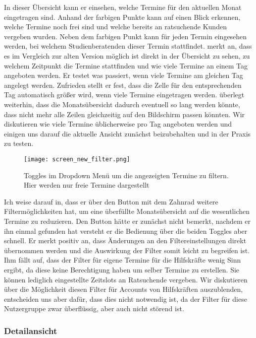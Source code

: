 In dieser Übersicht kann er einsehen, welche Termine für den aktuellen Monat
eingetragen sind. Anhand der farbigen Punkte  kann \ipName auf einen Blick erkennen, welche Termine noch frei sind
und welche bereits an ratsuchende Kunden vergeben wurden. Neben dem farbigen
Punkt kann für jeden Termin eingesehen werden, bei welchem Studienberatenden
dieser Termin stattfindet. \ipName merkt an, dass es im Vergleich zur alten
Version möglich ist direkt in der Übersicht zu sehen, zu welchem Zeitpunkt die
Termine stattfinden und wie viele Termine an einem Tag angeboten werden. Er
testet was passiert, wenn viele Termine am gleichen Tag angelegt werden.
Zufrieden stellt er fest, dass die Zelle für den entsprechenden Tag automatisch
größer wird, wenn viele Termine eingetragen werden. \ipName überlegt weiterhin,
dass die Monatsübersicht dadurch eventuell so lang werden könnte, dass nicht
mehr alle Zeilen gleichzeitig auf den Bildschirm passen könnten. Wir
diskutieren wie viele Termine üblicherweise pro Tag angeboten werden und
einigen uns darauf die aktuelle Ansicht zunächst beizubehalten und in der
Praxis zu testen.

\begin{figure}[H]
    \caption{Toggles im Dropdown Menü um die angezeigten Termine zu filtern. Hier werden nur freie Termine dargestellt}
    \centering
    \texttt{[image: screen\_new\_filter.png]}
\end{figure}

Ich weise \ipName darauf in, dass er über den Button mit dem Zahnrad weitere
Filtermöglichkeiten hat, um eine überfüllte Monatsübersicht auf die
wesentlichen Termine zu reduzieren. Den Button hätte er zunächst nicht bemerkt,
nachdem er ihn einmal gefunden hat versteht er die Bedienung über die beiden
Toggles aber schnell. Er merkt positiv an, dass Änderungen an den
Filtereinstellungen direkt übernommen werden und die Auswirkung der Filter
somit leicht zu begreifen ist. Ihm fällt auf, dass der Filter für eigene
Termine für die Hilfskräfte wenig Sinn ergibt, da diese keine Berechtigung
haben um selber Termine zu erstellen. Sie können lediglich eingestellte
Zeitslots an Ratsuchende vergeben. Wir diskutieren über die Möglichkeit diesen
Filter für Accounts von Hilfskräften auszublenden, entscheiden uns aber dafür,
dass dies nicht notwendig ist, da der Filter für diese Nutzergruppe zwar
überflüssig, aber auch nicht störend ist.

\subsubsection{Detailansicht}

